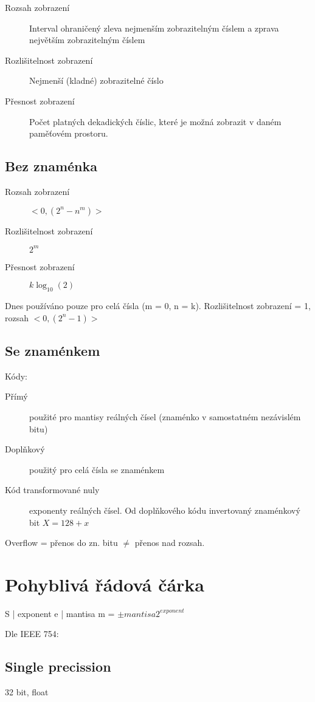 \documentclass[a4paper, 11pt]{report}
\begin{document}
\begin{description}
	\item[Rozsah zobrazení] Interval ohraničený zleva nejmenším zobrazitelným číslem a zprava největším zobrazitelným číslem
	\item[Rozlišitelnost zobrazení] Nejmenší (kladné) zobrazitelné číslo
	\item[Přesnost zobrazení] Počet platných dekadických číslic, které je možná zobrazit v daném paměťovém prostoru.
\end{description}

\subsection{Bez znaménka}

\begin{description}
	\item[Rozsah zobrazení] $< 0, (2^n - n^m) >$
	\item[Rozlišitelnost zobrazení] $2^m$
	\item[Přesnost zobrazení] $k \log_{10}(2)$
\end{description}

Dnes používáno pouze pro celá čísla (m = 0, n = k). Rozlišitelnost zobrazení = 1, rozsah $<0, (2^n-1)>$

\subsection{Se znaménkem}

Kódy:
\begin{description}
	\item[Přímý] použité pro mantisy reálných čísel (znaménko v samostatném nezávislém bitu)
	\item[Doplňkový] použitý pro celá čísla se znaménkem
	\item[Kód transformované nuly] exponenty reálných čísel. Od doplňkového kódu invertovaný znaménkový bit $X = 128 + x$
\end{description}

Overflow = přenos do zn. bitu $\neq$ přenos nad rozsah.

\section{Pohyblivá řádová čárka}

S | exponent e | mantisa m = $\pm mantisa 2^{exponent}$ 

Dle IEEE 754:
\subsection{Single precission}
32 bit, float
\end{document}
